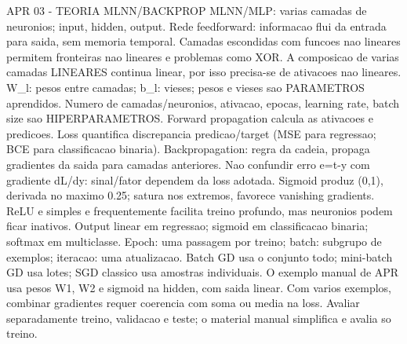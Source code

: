 APR 03 - TEORIA MLNN/BACKPROP
MLNN/MLP: varias camadas de neuronios; input, hidden, output.
Rede feedforward: informacao flui da entrada para saida, sem memoria temporal.
Camadas escondidas com funcoes nao lineares permitem fronteiras nao lineares e problemas como XOR.
A composicao de varias camadas LINEARES continua linear, por isso precisa-se de ativacoes nao lineares.
W_l: pesos entre camadas; b_l: vieses; pesos e vieses sao PARAMETROS aprendidos.
Numero de camadas/neuronios, ativacao, epocas, learning rate, batch size sao HIPERPARAMETROS.
Forward propagation calcula as ativacoes e predicoes.
Loss quantifica discrepancia predicao/target (MSE para regressao; BCE para classificacao binaria).
Backpropagation: regra da cadeia, propaga gradientes da saida para camadas anteriores.
Nao confundir erro e=t-y com gradiente dL/dy: sinal/fator dependem da loss adotada.
Sigmoid produz (0,1), derivada no maximo 0.25; satura nos extremos, favorece vanishing gradients.
ReLU e simples e frequentemente facilita treino profundo, mas neuronios podem ficar inativos.
Output linear em regressao; sigmoid em classificacao binaria; softmax em multiclasse.
Epoch: uma passagem por treino; batch: subgrupo de exemplos; iteracao: uma atualizacao.
Batch GD usa o conjunto todo; mini-batch GD usa lotes; SGD classico usa amostras individuais.
O exemplo manual de APR usa pesos W1, W2 e sigmoid na hidden, com saida linear.
Com varios exemplos, combinar gradientes requer coerencia com soma ou media na loss.
Avaliar separadamente treino, validacao e teste; o material manual simplifica e avalia so treino.